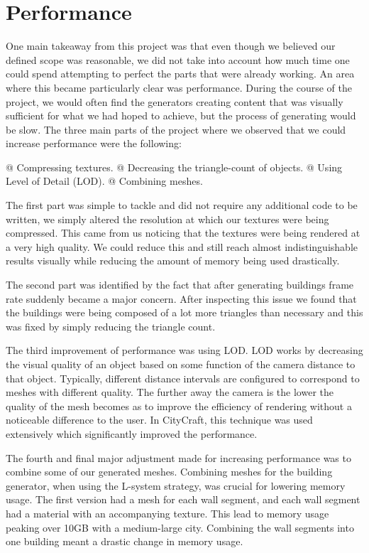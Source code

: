\section{Performance}

One main takeaway from this project was that even though we believed our defined scope was reasonable, we did not take into account how much time one could spend attempting to perfect the parts that were already working.
An area where this became particularly clear was performance.
During the course of the project, we would often find the generators creating content that was visually sufficient for what we had hoped to achieve, but the process of generating would be slow. 
The three main parts of the project where we observed that we could increase performance were the following:

\begin{easylist}
  @ Compressing textures.
  @ Decreasing the triangle-count of objects.
  @ Using Level of Detail (LOD).
  @ Combining meshes. 
 \end{easylist}
 
The first part was simple to tackle and did not require any additional code to be written, we simply altered the resolution at which our textures were being compressed.
This came from us noticing that the textures were being rendered at a very high quality.
We could reduce this and still reach almost indistinguishable results visually while reducing the amount of memory being used drastically. 

The second part was identified by the fact that after generating buildings frame rate suddenly became a major concern. 
After inspecting this issue we found that the buildings were being composed of a lot more triangles than necessary and this was fixed by simply reducing the triangle count. 

The third improvement of performance was using LOD.
LOD works by decreasing the visual quality of an object based on some function of the camera distance to that object.
Typically, different distance intervals are configured to correspond to meshes with different quality.
The further away the camera is the lower the quality of the mesh becomes as to improve the efficiency of rendering without a noticeable difference to the user.
In CityCraft, this technique was used extensively which significantly improved the performance.

The fourth and final major adjustment made for increasing performance was to combine some of our generated meshes. 
Combining meshes for the building generator, when using the L-system strategy, was crucial for lowering memory usage. 
The first version had a mesh for each wall segment, and each wall segment had a material with an accompanying texture. 
This lead to memory usage peaking over 10GB with a medium-large city. 
Combining the wall segments into one building meant a drastic change in memory usage. 


